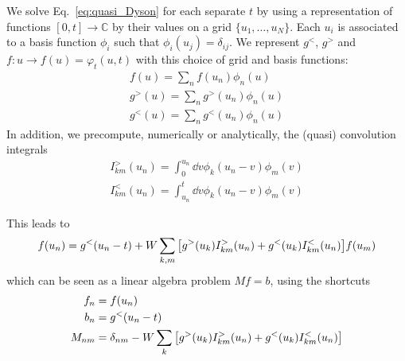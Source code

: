 \documentclass[12pt]{article}
\begin{document}
We solve Eq.~\eqref{eq:quasi_Dyson} for each separate $t$ by using a representation of functions $[0, t] \rightarrow \mathbb{C}$ by their values on a grid $\{u_1, \ldots, u_N\}$. Each $u_i$ is associated to a basis function $\phi_i$ such that $\phi_i(u_j) = \delta_{ij}$. We represent $g^<$, $g^>$ and $f:u \rightarrow f(u) = \varphi_t(u, t)$ with this choice of grid and basis functions:
\begin{gather}
	f(u) = \sum_n f(u_n) \phi_n(u)
	\\
	g^>(u) = \sum_n g^>(u_n) \phi_n(u)
	\\
	g^<(u) = \sum_n g^<(u_n) \phi_n(u)
\end{gather}
In addition, we precompute, numerically or analytically, the (quasi) convolution integrals
\begin{gather}
	I^>_{km}(u_n) = \int_0^{u_n} \dd{v} \phi_k(u_n - v) \phi_m(v)
	\\
	I^<_{km}(u_n) = \int_{u_n}^t \dd{v} \phi_k(u_n - v) \phi_m(v)
\end{gather}

This leads to
\begin{equation}
	f(u_n) = g^<(u_n - t) + W \sum_{k,m} \qty[g^>(u_k) I^>_{km}(u_n) + g^<(u_k) I^<_{km}(u_n)] f(u_m)
\end{equation}
which can be seen as a linear algebra problem $M f = b$, using the shortcuts
\begin{align}
	f_n ={}& f(u_n)
	\\
	b_n ={}& g^<(u_n - t)
	\\
	M_{nm} ={}& \delta_{nm} - W \sum_k \qty[g^>(u_k) I^>_{km}(u_n) + g^<(u_k) I^<_{km}(u_n)]
\end{align}



\end{document}
